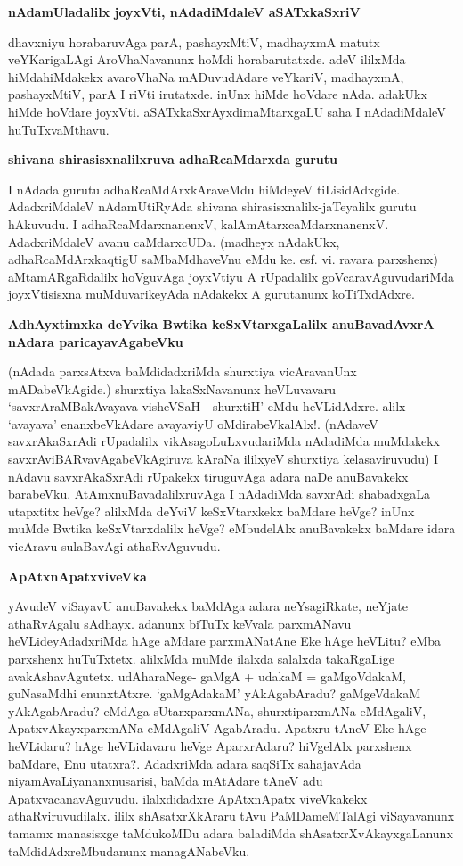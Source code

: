 \noindent
{\bf\large{nAdamUladalilx joyxVti, nAdadiMdaleV aSATxkaSxriV}}\label{page172}

dhavxniyu horabaruvAga parA, pashayxMtiV, madhayxmA matutx veYKarigaLAgi AroVhaNavanunx hoMdi horabarutatxde. adeV ililxMda hiMdahiMdakekx avaroVhaNa mADuvudAdare veYkariV, madhayxmA, pashayxMtiV, parA I riVti irutatxde. inUnx hiMde hoVdare nAda. adakUkx hiMde hoVdare joyxVti. aSATxkaSxrAyxdimaMtarxgaLU saha I nAdadiMdaleV huTuTxvaMthavu.

\noindent
{\bf\large{shivana shirasisxnalilxruva adhaRcaMdarxda gurutu}}\label{page172}

I nAdada gurutu adhaRcaMdArxkAraveMdu hiMdeyeV tiLisidAdxgide. AdadxriMdaleV nAdamUtiRyAda shivana shirasisxnalilx-jaTeyalilx gurutu hAkuvudu. I adhaRcaMdarxnanenxV, kalAmAtarxcaMdarxnanenxV. AdadxriMdaleV avanu caMdarxcUDa. (madheyx nAdakUkx, adhaRcaMdArxkaqtigU saMbaMdhaveVnu eMdu ke. esf. vi. ravara parxshenx) aMtamARgaRdalilx hoVguvAga joyxVtiyu A rUpadalilx goVcaravAguvudariMda joyxVtisisxna muMduvarikeyAda nAdakekx A gurutanunx koTiTxdAdxre.

\noindent
{\bf\large{AdhAyxtimxka deYvika Bwtika keSxVtarxgaLalilx anuBavadAvxrA nAdara paricayavAgabeVku}}\label{page172}

(nAdada parxsAtxva baMdidadxriMda shurxtiya vicAravanUnx mADabeVkAgide.) shurxtiya lakaSxNavanunx heVLuvavaru `savxrAraMBakAvayava visheVSaH\label{172} - shurxtiH' eMdu heVLidAdxre. alilx `avayava' enanxbeVkAdare avayaviyU oMdirabeVkalAlx!. (nAdaveV savxrAkaSxrAdi rUpadalilx vikAsagoLuLxvudariMda nAdadiMda muMdakekx savxrAviBARvavAgabeVkAgiruva kAraNa ililxyeV shurxtiya kelasaviruvudu) I nAdavu savxrAkaSxrAdi rUpakekx tiruguvAga adara naDe anuBavakekx barabeVku. AtAmxnuBavadalilxruvAga I nAdadiMda savxrAdi shabadxgaLa utapxtitx heVge? alilxMda deYviV keSxVtarxkekx baMdare heVge? inUnx muMde Bwtika keSxVtarxdalilx heVge? eMbudelAlx anuBavakekx baMdare idara vicAravu sulaBavAgi athaRvAguvudu.

\noindent
{\bf\large{ApAtxnApatxviveVka}}\label{page173}

yAvudeV viSayavU anuBavakekx baMdAga adara neYsagiRkate, neYjate athaRvAgalu sAdhayx. adanunx biTuTx keVvala parxmANavu heVLideyAdadxriMda hAge aMdare parxmANatAne Eke hAge heVLitu? eMba parxshenx huTuTxtetx. alilxMda muMde ilalxda salalxda takaRgaLige avakAshavAgutetx. udAharaNege- gaMgA + udakaM = gaMgoVdakaM, guNasaMdhi enunxtAtxre. `gaMgAdakaM' yAkAgabAradu? gaMgeVdakaM yAkAgabAradu? eMdAga sUtarxparxmANa, shurxtiparxmANa eMdAgaliV, ApatxvAkayxparxmANa eMdAgaliV AgabAradu. Apatxru tAneV Eke hAge heVLidaru? hAge heVLidavaru heVge AparxrAdaru? hiVgelAlx parxshenx baMdare, Enu utatxra?. AdadxriMda adara saqSiTx sahajavAda niyamAvaLiyananxnusarisi, baMda mAtAdare tAneV adu ApatxvacanavAguvudu. ilalxdidadxre ApAtxnApatx viveVkakekx athaRviruvudilalx. ililx shAsatxrXkAraru tAvu PaMDameMTalAgi viSayavanunx tamamx manasisxge taMdukoMDu adara baladiMda shAsatxrXvAkayxgaLanunx taMdidAdxreMbudanunx managANabeVku.


